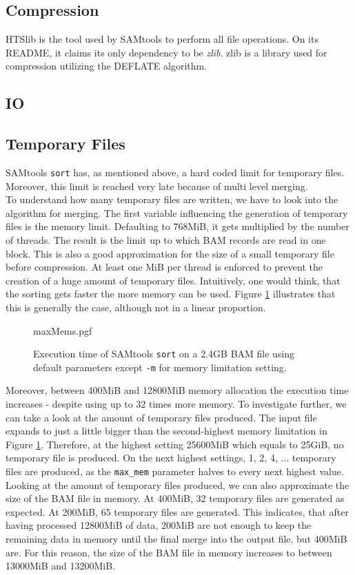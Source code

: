 \subsection{Compression}
HTSlib is the tool used by SAMtools to perform all file operations. On its README, it claims its only dependency to be \textit{zlib}. zlib is a library used for compression utilizing the DEFLATE algorithm. 

\subsection{IO}


\subsection{Temporary Files}
SAMtools \texttt{sort} has, as mentioned above, a hard coded limit for temporary files. Moreover, this limit is reached very late because of multi level merging. \\
To understand how many temporary files are written, we have to look into the algorithm for merging. The first variable influencing the generation of temporary files is the memory limit. Defaulting to 768MiB, it gets multiplied by the number of threads. The result is the limit up to which BAM records are read in one block. This is also a good approximation for the size of a small temporary file before compression. At least one MiB per thread is enforced to prevent the creation of a huge amount of temporary files. Intuitively, one would think, that the sorting gets faster the more memory can be used. Figure \ref{fig:maxMems} illustrates that this is generally the case, although not in a linear proportion.
\begin{figure}
        {maxMems.pgf}
    \caption{Execution time of SAMtools \texttt{sort} on a 2.4GB BAM file using default parameters except \texttt{-m} for memory limitation setting. }
    \label{fig:maxMems}
\end{figure}
Moreover, between 400MiB and 12800MiB memory allocation the execution time increases - despite using up to 32 times more memory. To investigate further, we can take a look at the amount of temporary files produced. The input file expands to just a little bigger than the second-highest memory limitation in Figure \ref{fig:maxMems}. Therefore, at the highest setting 25600MiB which equals to 25GiB, no temporary file is produced. On the next highest settings, 1, 2, 4, ... temporary files are produced, as the \texttt{max\_mem} parameter halves to every next highest value. Looking at the amount of temporary files produced, we can also approximate the size of the BAM file in memory. At 400MiB, 32 temporary files are generated as expected. At 200MiB, 65 temporary files are generated. This indicates, that after having processed 12800MiB of data, 200MiB are not enough to keep the remaining data in memory until the final merge into the output file, but 400MiB are. For this reason, the size of the BAM file in memory increases to between 13000MiB and 13200MiB. \\
